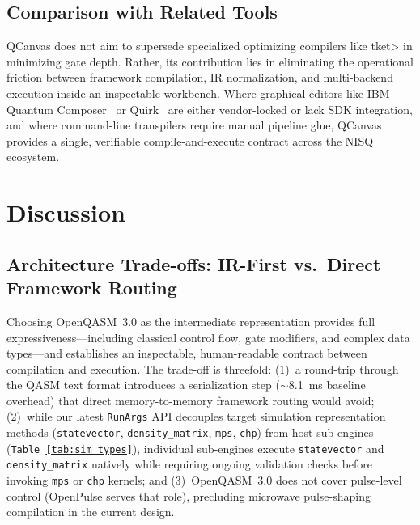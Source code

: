 \documentclass[runningheads]{llncs}
\begin{document}
\subsection{Comparison with Related Tools}

QCanvas does not aim to supersede specialized optimizing compilers like \textsf{t\textbar ket\textgreater} in minimizing gate depth. Rather, its contribution lies in eliminating the operational friction between framework compilation, IR normalization, and multi-backend execution inside an inspectable workbench. Where graphical editors like IBM Quantum Composer~\cite{ibmcomposer2024} or Quirk~\cite{gidney2017} are either vendor-locked or lack SDK integration, and where command-line transpilers require manual pipeline glue, QCanvas provides a single, verifiable compile-and-execute contract across the NISQ ecosystem.

\FloatBarrier


\section{Discussion}

\subsection{Architecture Trade-offs: IR-First vs.\ Direct Framework Routing}

Choosing OpenQASM~3.0 as the intermediate representation provides full expressiveness---including classical control flow, gate modifiers, and complex data types---and establishes an inspectable, human-readable contract between compilation and execution. The trade-off is threefold: (1)~a round-trip through the QASM text format introduces a serialization step ($\sim$8.1~ms baseline overhead) that direct memory-to-memory framework routing would avoid; (2)~while our latest \texttt{RunArgs} API decouples target simulation representation methods (\texttt{statevector}, \texttt{density\_matrix}, \texttt{mps}, \texttt{chp}) from host sub-engines (\texttt{Table~\ref{tab:sim_types}}), individual sub-engines execute \texttt{statevector} and \texttt{density\_matrix} natively while requiring ongoing validation checks before invoking \texttt{mps} or \texttt{chp} kernels; and (3)~OpenQASM~3.0 does not cover pulse-level control (OpenPulse serves that role), precluding microwave pulse-shaping compilation in the current design.
\end{document}
